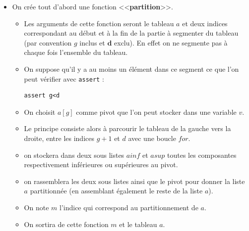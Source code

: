 \begin{itemize}
\item On crée tout d'abord une fonction <<\textbf{partition}>>. 
\begin{itemize}
\item Les arguments de cette fonction seront le tableau \textbf{$a$} et deux indices correspondant au début et à la fin de la partie à segmenter du tableau (par convention \textbf{$g$} inclus et $\textbf{d}$ exclu). En effet on ne segmente pas à chaque fois l'ensemble du tableau.
\item On suppose qu'il y a au moins un élément dans ce segment ce que l'on peut vérifier avec \texttt{assert} : 


	\begin{DDbox}{\linewidth}
		\begin{verbatim}
assert g<d
		\end{verbatim}
	\end{DDbox}
\item On choisit \textbf{$a[g]$} comme pivot que l'on peut stocker dans une variable $v$.
\item Le principe consiste alors à parcourir le tableau de la gauche vers la droite, entre les indices \textbf{$g+1$} et \textbf{$d$} avec une boucle \textbf{$for$}.
\item on stockera dans deux sous listes \textbf{$ainf$} et \textbf{$asup$} toutes les composantes respectivement inférieures ou supérieures au pivot.
\item on rassemblera les deux sous listes ainsi que le pivot pour donner la liste \textbf{$a$} partitionnée (en assemblant également le reste de la liste $a$).
\item On note $m$ l'indice qui correspond au partitionnement de $a$.
\item On sortira de cette fonction $m$ et le tableau $a$.
\end{itemize}
\end{itemize}


